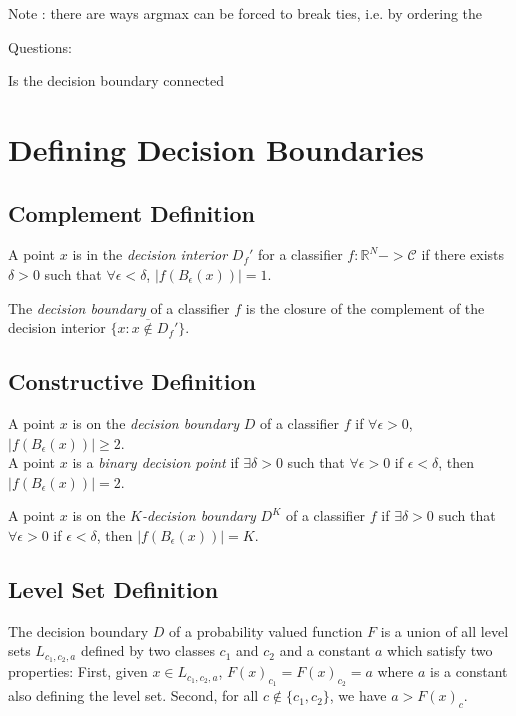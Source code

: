 Note : there are ways argmax can be forced to break ties, i.e. by ordering the 

Questions:

Is the decision boundary connected


\section{Defining Decision Boundaries}

\subsection{Complement Definition}

A point $x$ is in the \emph{decision interior} $D_f'$ for a classifier $f: \mathbb{R}^N -> \mathcal{C}$ if there exists $\delta > 0$ such that $\forall \epsilon < \delta$, $|f(B_\epsilon(x))| = 1$. 

The \emph{decision boundary} of a classifier $f$ is the closure of the complement of the decision interior $\overline{\{x : x \notin D_f'\}}$. 

\subsection{Constructive Definition}

A point $x$ is on the \emph{decision boundary} $D$ of a classifier $f$ if $\forall \epsilon > 0$, $|f(B_\epsilon(x))| \geq 2$.\\

A point $x$ is a \emph{binary decision point} if $\exists \delta > 0$ such that $\forall \epsilon > 0$ if $\epsilon < \delta$, then $|f(B_\epsilon(x))| = 2$. 

A point $x$ is on the \emph{$K$-decision boundary} $D^K$ of a classifier $f$ if $\exists \delta > 0$ such that $\forall \epsilon > 0$ if $\epsilon < \delta$, then $|f(B_\epsilon(x))| = K$. 

\subsection{Level Set Definition}

The decision boundary $D$ of a probability valued function $F$ is a union of all level sets $L_{c_1, c_2, a}$ defined by two classes $c_1$ and $c_2$ and a constant $a$ which satisfy two properties: First, given $x \in L_{c_1, c_2, a}$, $F(x)_{c_1} = F(x)_{c_2} = a$ where $a$ is a constant also defining the level set. Second, for all $c \notin \{c_1, c_2\}$, we have $a > F(x)_c$.   

